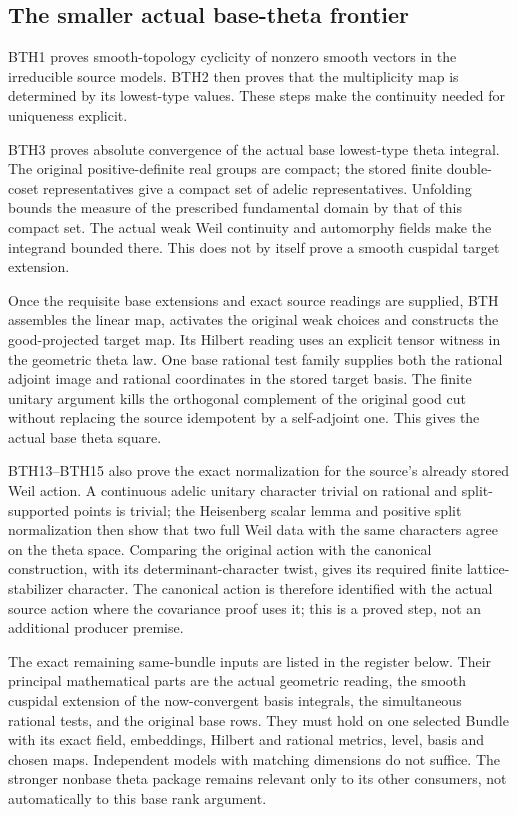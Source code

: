 \subsection{The smaller actual base-theta frontier}

BTH1 proves smooth-topology cyclicity of nonzero smooth vectors in
the irreducible source models. BTH2 then proves that the multiplicity
map is determined by its lowest-type values. These steps make the
continuity needed for uniqueness explicit.

BTH3 proves absolute convergence of the actual base lowest-type theta
integral. The original positive-definite real groups are compact;
the stored finite double-coset representatives give a compact set of
adelic representatives. Unfolding bounds the measure of the prescribed
fundamental domain by that of this compact set. The actual weak Weil
continuity and automorphy fields make the integrand bounded there.
This does not by itself prove a smooth cuspidal target extension.

Once the requisite base extensions and exact source readings are
supplied, BTH assembles the linear map, activates the original weak
choices and constructs the good-projected target map. Its Hilbert
reading uses an explicit tensor witness in the geometric theta law.
One base rational test family supplies both the rational adjoint
image and rational coordinates in the stored target basis.
The finite unitary argument kills the orthogonal complement of the
original good cut without replacing the source idempotent by a
self-adjoint one. This gives the actual base theta square.

BTH13--BTH15 also prove the exact normalization for the source's
already stored Weil action. A continuous adelic unitary character
trivial on rational and split-supported points is trivial; the
Heisenberg scalar lemma and positive split normalization then show
that two full Weil data with the same characters agree on the theta
space. Comparing the original action with the canonical construction,
with its determinant-character twist, gives its required finite
lattice-stabilizer character. The canonical action is therefore
identified with the actual source action where the covariance proof
uses it; this is a proved step, not an additional producer premise.

The exact remaining same-bundle inputs are listed in the register
below. Their principal mathematical parts are the actual geometric
reading, the smooth cuspidal extension of the now-convergent basis
integrals, the simultaneous rational tests, and the original base
rows. They must hold on one selected Bundle with its exact field,
embeddings, Hilbert and rational metrics, level, basis and chosen
maps. Independent models with matching dimensions do not suffice.
The stronger nonbase theta package remains relevant only to its
other consumers, not automatically to this base rank argument.

